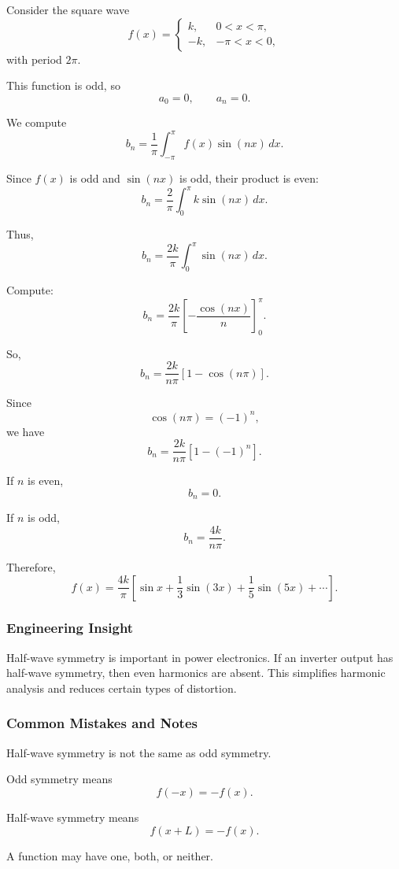 \begin{examplebox}
Consider the square wave
\[
f(x)=
\begin{cases}
k, & 0<x<\pi,\\
-k, & -\pi<x<0,
\end{cases}
\]
with period $2\pi$.

This function is odd, so
\[
a_0=0,\qquad a_n=0.
\]

We compute
\[
b_n=\frac{1}{\pi}\int_{-\pi}^{\pi}f(x)\sin(nx)\,dx.
\]

Since $f(x)$ is odd and $\sin(nx)$ is odd, their product is even:
\[
b_n=\frac{2}{\pi}\int_0^\pi k\sin(nx)\,dx.
\]

Thus,
\[
b_n=\frac{2k}{\pi}
\int_0^\pi \sin(nx)\,dx.
\]

Compute:
\[
b_n=
\frac{2k}{\pi}
\left[
-\frac{\cos(nx)}{n}
\right]_0^\pi.
\]

So,
\[
b_n=
\frac{2k}{n\pi}
\left[1-\cos(n\pi)\right].
\]

Since
\[
\cos(n\pi)=(-1)^n,
\]
we have
\[
b_n=
\frac{2k}{n\pi}\left[1-(-1)^n\right].
\]

If $n$ is even,
\[
b_n=0.
\]

If $n$ is odd,
\[
b_n=\frac{4k}{n\pi}.
\]

Therefore,
\[
f(x)=\frac{4k}{\pi}
\left[
\sin x+\frac{1}{3}\sin(3x)+\frac{1}{5}\sin(5x)+\cdots
\right].
\]
\end{examplebox}

\subsubsection*{Engineering Insight}

\begin{noteBox}
Half-wave symmetry is important in power electronics. If an inverter output has half-wave symmetry, then even harmonics are absent. This simplifies harmonic analysis and reduces certain types of distortion.
\end{noteBox}

\subsubsection*{Common Mistakes and Notes}

\begin{conceptbox}
Half-wave symmetry is not the same as odd symmetry.

Odd symmetry means
\[
f(-x)=-f(x).
\]

Half-wave symmetry means
\[
f(x+L)=-f(x).
\]

A function may have one, both, or neither.
\end{conceptbox}